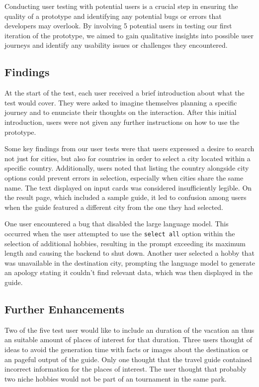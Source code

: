 \documentclass[english,notitlepage,smartquotes]{hgbreport}
\begin{document}
Conducting user testing with potential users is a crucial step in ensuring the quality of a prototype and identifying any potential bugs or errors that developers may overlook. By involving 5 potential users in testing our first iteration of the prototype, we aimed to gain qualitative insights into possible user journeys and identify any usability issues or challenges they encountered.

\subsection{Findings}

At the start of the test, each user received a brief introduction about what the test would cover. They were asked to imagine themselves planning a specific journey and to enunciate their thoughts on the interaction. After this initial introduction, users were not given any further instructions on how to use the prototype.

Some key findings from our user tests were that users expressed a desire to search not just for cities, but also for countries in order to select a city located within a specific country. Additionally, users noted that listing the country alongside city options could prevent errors in selection, especially when cities share the same name. The text displayed on input cards was considered insufficiently legible. On the result page, which included a sample guide, it led to confusion among users when the guide featured a different city from the one they had selected.

One user encountered a bug that disabled the large language model. This occurred when the user attempted to use the \texttt{select all} option within the selection of additional hobbies, resulting in the prompt exceeding its maximum length and causing the backend to shut down. Another user selected a hobby that was unavailable in the destination city, prompting the language model to generate an apology stating it couldn't find relevant data, which was then displayed in the guide.


\subsection{Further Enhancements}
Two of the five test user would like to include an duration of the vacation an thus an suitable amount of places of interest for that duration. Three users thought of ideas to avoid the generation time with facts or images about the destination or an pageful output of the guide. Only one thought that the travel guide contained incorrect information for the places of interest. The user thought that probably two niche hobbies would not be part of an tournament in the same park.
\end{document}
